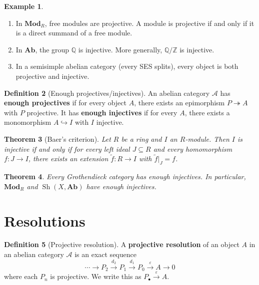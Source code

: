 \documentclass[a4paper,12pt]{book}
\newcommand{\Ab}{\mathbf{Ab}}
\newcommand{\Mod}{\mathbf{Mod}}
\theoremstyle{definition}
\newtheorem{definition}{Definition}[section]
\newtheorem{example}[definition]{Example}
\theoremstyle{plain}
\newtheorem{theorem}[definition]{Theorem}
\theoremstyle{remark}
\begin{document}
\begin{example}\label{ex:proj-inj-examples}
\begin{enumerate}
    \item{}
    In $\Mod_R$, free modules are projective. A module is projective if and only if it
    is a direct summand of a free module.
    \item{}
    In $\Ab$, the group $\mathbb{Q}$ is injective. More generally, $\mathbb{Q}/\mathbb{Z}$
    is injective.
    \item In a semisimple abelian category (every SES splits), every object is both
    projective and injective.
\end{enumerate}
\end{example}

\begin{definition}[Enough projectives/injectives]\label{def:enough-proj-inj}
An abelian category $\mathcal{A}$ has \textbf{enough projectives} if for every object $A$,
there exists an epimorphism $P \twoheadrightarrow A$ with $P$ projective. It has
\textbf{enough injectives} if for every $A$, there exists a monomorphism $A \hookrightarrow I$
with $I$ injective.
\end{definition}

\begin{theorem}[Baer's criterion]\label{thm:baer-criterion}
Let $R$ be a ring and $I$ an $R$-module. Then $I$ is injective if and only if for every
left ideal $J \subseteq R$ and every homomorphism $f \colon J \to I$, there exists an
extension $\tilde{f} \colon R \to I$ with $\tilde{f}|_J = f$.
\end{theorem}

\begin{theorem}\label{thm:grothendieck-injectives}
Every Grothendieck category has enough injectives. In particular, $\Mod_R$ and
$\operatorname{Sh}(X, \Ab)$ have enough injectives.
\end{theorem}


\section{Resolutions}\label{sec:resolutions}

\begin{definition}[Projective resolution]\label{def:proj-resolution}
A \textbf{projective resolution} of an object $A$ in an abelian category $\mathcal{A}$
is an exact sequence
\[
    \cdots \longrightarrow P_2 \xrightarrow{d_2} P_1 \xrightarrow{d_1} P_0
    \xrightarrow{\varepsilon} A \longrightarrow 0
\]
where each $P_n$ is projective. We write this as $P_\bullet \xrightarrow{\varepsilon} A$.
\end{definition}
\end{document}

